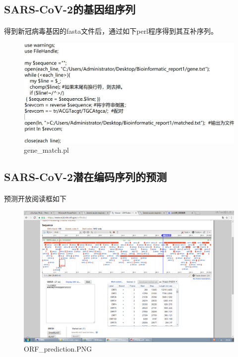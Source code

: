 \documentclass[supercite]{HustGraduPaper}
\begin{document}
	\subsection{SARS-CoV-2的基因组序列}
	\paragraph{}\label{subpara:subpara}得到新冠病毒基因的fasta文件后，通过如下perl程序得到其互补序列。
	\begin{figure}[H]
		\centering
		\includegraphics{./material/practice1/perl_2.jpg}
		\caption{gene\_match.pl}
	\end{figure}

  \subsection{SARS-CoV-2潜在编码序列的预测}
	\paragraph{}\label{subpara:subpara}预测开放阅读框如下
	\begin{figure}[H]
		\centering
		\includegraphics[width=1\textwidth]{./material/practice1/ORF.PNG}
    \caption{ORF\_prediction.PNG}
  \end{figure}
	\clearpage
\end{document}
